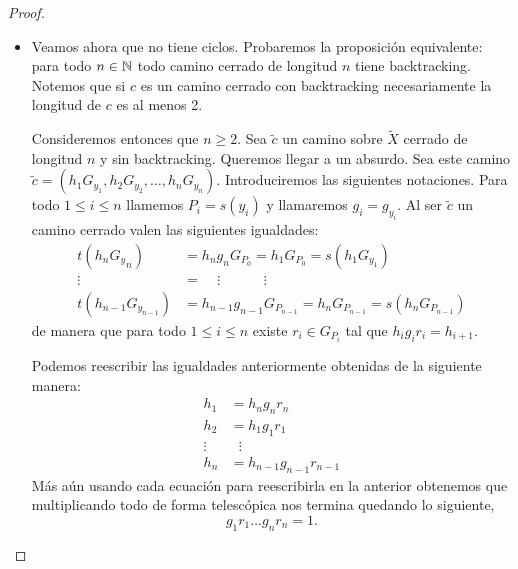 \documentclass[tesis.tex]{subfiles}
\begin{document}
\begin{proof}
\begin{itemize}
		
		
		
		
		
		
		\item 
		Veamos ahora que no tiene ciclos.
		Probaremos la proposición equivalente: para todo $n \in \mathbb{N}$ todo camino cerrado de longitud $n$ tiene backtracking.
		Notemos que si $c$ es un camino cerrado con backtracking necesariamente la longitud de $c$ es al menos 2.
		
		Consideremos entonces que $n \ge 2$.
		Sea $\widetilde c$ un camino sobre $\widetilde X$ cerrado de longitud $n$ y sin backtracking.
		Queremos llegar a un absurdo.
		Sea este camino $\widetilde c = (h_1G_{y_1}, h_2 G_{y_2}, \dots, h_n G_{y_n})$.
		Introduciremos las siguientes notaciones.
		Para todo $1 \le i \le n$ llamemos $P_{i} = s(y_i)$ y llamaremos $g_i = g_{y_i}$.
		Al ser $\widetilde c$ un camino cerrado valen las siguientes igualdades:
		\begin{align*}
			t(h_n{G_y}_n) &= h_ng_nG_{P_0} = h_1G_{P_0} = s(h_1G_{ y_1}) \\ 
			\vdots \ \ \  &= \ \ \ \ \    \vdots\ \ \ \ \ \ \ \ \ \ \ \ \ \    \vdots \\
			t(h_{n-1}G_{y_{n-1}}) &= h_{n-1}g_{n-1}G_{P_{n-1}} = h_{n}G_{P_{n-1}} = s(h_nG_{P_{n-1}} )  
		\end{align*}
		de manera que para todo $1 \le i \le n$ existe $r_i \in G_{P_i}$ tal que $h_ig_ir_i = h_{i+1}$. 	
		
		Podemos reescribir las igualdades anteriormente obtenidas de la siguiente manera:
		\begin{align*}
			h_1 &= h_{n}g_{n}r_{n} \\
			h_2 &= h_1g_1r_1 \\
			\vdots & \ \ \ \vdots \\
			h_n &= h_{n-1}g_{n-1}r_{n-1} 
		\end{align*}
		Más aún usando cada ecuación para reescribirla en la anterior obtenemos que multiplicando todo de forma telescópica nos termina quedando lo siguiente,
		\begin{equation}\label{eq_cmu_1}
			g_1r_1\dots g_nr_n = 1.
		\end{equation} 
		

\end{itemize}
\end{proof}
\end{document}

